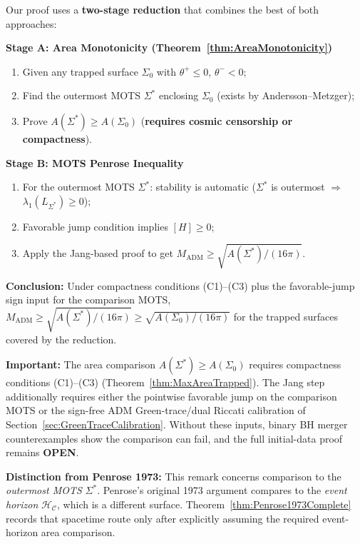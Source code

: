\begin{remark}\label{rem:MOTSStabilityRole}
Our proof uses a \textbf{two-stage reduction} that combines the best of both approaches:

\textbf{Stage A: Area Monotonicity (Theorem~\ref{thm:AreaMonotonicity})}
\begin{enumerate}
    \item Given any trapped surface $\Sigma_0$ with $\theta^+ \le 0$, $\theta^- < 0$;
    \item Find the outermost MOTS $\Sigma^*$ enclosing $\Sigma_0$ (exists by Andersson--Metzger);
    \item Prove $A(\Sigma^*) \ge A(\Sigma_0)$ (\textbf{requires cosmic censorship or compactness}).
\end{enumerate}

\textbf{Stage B: MOTS Penrose Inequality}
\begin{enumerate}
    \item For the outermost MOTS $\Sigma^*$: stability is automatic ($\Sigma^*$ is outermost $\Rightarrow$ $\lambda_1(L_{\Sigma^*}) \ge 0$);
    \item Favorable jump condition implies $[H] \ge 0$;
    \item Apply the Jang-based proof to get $M_{\mathrm{ADM}} \ge \sqrt{A(\Sigma^*)/(16\pi)}$.
\end{enumerate}

\textbf{Conclusion:} Under compactness conditions (C1)--(C3) plus the favorable-jump sign input for the comparison MOTS, $M_{\mathrm{ADM}} \ge \sqrt{A(\Sigma^*)/(16\pi)} \ge \sqrt{A(\Sigma_0)/(16\pi)}$ for the trapped surfaces covered by the reduction.

\textbf{Important:} The area comparison $A(\Sigma^*) \ge A(\Sigma_0)$ requires compactness conditions (C1)--(C3) (Theorem~\ref{thm:MaxAreaTrapped}). The Jang step additionally requires either the pointwise favorable jump on the comparison MOTS or the sign-free ADM Green-trace/dual Riccati calibration of Section~\ref{sec:GreenTraceCalibration}. Without these inputs, binary BH merger counterexamples show the comparison can fail, and the full initial-data proof remains \textbf{OPEN}.

\textbf{Distinction from Penrose 1973:} This remark concerns comparison to the \emph{outermost MOTS} $\Sigma^*$. Penrose's original 1973 argument compares to the \emph{event horizon} $\mathcal{H}_\mathcal{C}$, which is a different surface. Theorem~\ref{thm:Penrose1973Complete} records that spacetime route only after explicitly assuming the required event-horizon area comparison.
\end{remark}


